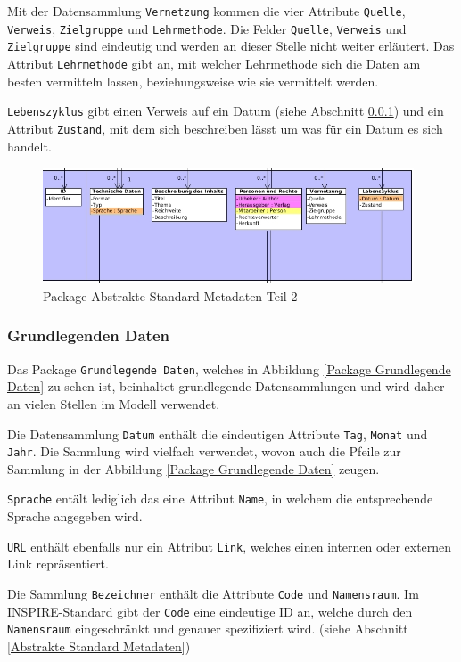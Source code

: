 Mit der Datensammlung \texttt{Vernetzung} kommen die vier Attribute \texttt{Quelle}, \texttt{Verweis}, \texttt{Zielgruppe} und \texttt{Lehrmethode}. Die Felder \texttt{Quelle}, \texttt{Verweis} und \texttt{Zielgruppe} sind eindeutig und werden an dieser Stelle nicht weiter erl\"autert. Das Attribut \texttt{Lehrmethode} gibt an, mit welcher Lehrmethode sich die Daten am besten vermitteln lassen, beziehungsweise wie sie vermittelt werden.

\texttt{Lebenszyklus} gibt einen Verweis auf ein Datum (siehe Abschnitt \ref{Grundlegenden Daten}) und ein Attribut \texttt{Zustand}, mit dem sich beschreiben l\"asst um was f\"ur ein Datum es sich handelt.

\begin{figure}[!ht]
\centering
\includegraphics[width=11cm]{Bilder/Datenmodell/Package-Abstrakte-Metadaten-Teil2.jpg}
\caption{Package Abstrakte Standard Metadaten Teil 2}
\label{Package Abstrakte Standard Metadaten Teil 2}
\centering
\end{figure}

\FloatBarrier
\subsubsection{Grundlegenden Daten} \label{Grundlegenden Daten}
Das Package \texttt{Grundlegende Daten}, welches in Abbildung \ref{Package Grundlegende Daten} zu sehen ist, beinhaltet grundlegende Datensammlungen und wird daher an vielen Stellen im Modell verwendet. 

Die Datensammlung \texttt{Datum} enth\"alt die eindeutigen Attribute \texttt{Tag}, \texttt{Monat} und \texttt{Jahr}. Die Sammlung wird vielfach verwendet, wovon auch die Pfeile zur Sammlung in der Abbildung \ref{Package Grundlegende Daten} zeugen.

\texttt{Sprache} ent\"alt lediglich das eine Attribut \texttt{Name}, in welchem die entsprechende Sprache angegeben wird.

\texttt{URL} enth\"alt ebenfalls nur ein Attribut \texttt{Link}, welches einen internen oder externen Link repr\"asentiert.

Die Sammlung \texttt{Bezeichner} enth\"alt die Attribute \texttt{Code} und \texttt{Namensraum}. Im \ac{INSPIRE}-Standard gibt der \texttt{Code} eine eindeutige ID an, welche durch den \texttt{Namensraum} eingeschr\"ankt und genauer spezifiziert wird. (siehe Abschnitt \ref{Abstrakte Standard Metadaten})

